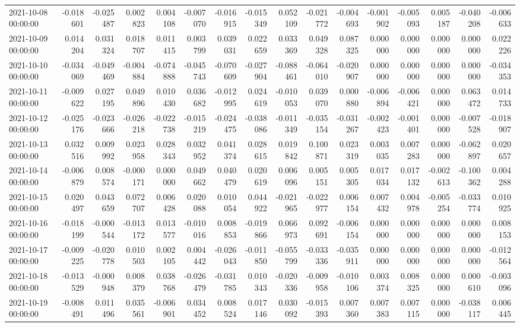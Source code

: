 \begin{tabular}{lrrrrrrrrrrrrrrr}
2021-10-08 00:00:00 & -0.018601 & -0.025487 & 0.002823 & 0.004108 & -0.007070 & -0.016915 & -0.015349 & 0.052109 & -0.021772 & -0.004693 & -0.001902 & -0.005093 & 0.005187 & -0.040208 & -0.006633 \\
2021-10-09 00:00:00 & 0.014204 & 0.031324 & 0.018707 & 0.011415 & 0.003799 & 0.039031 & 0.022659 & 0.033369 & 0.049328 & 0.087325 & 0.000000 & 0.000000 & 0.000000 & 0.000000 & 0.022226 \\
2021-10-10 00:00:00 & -0.034069 & -0.049469 & -0.004884 & -0.074888 & -0.045743 & -0.070609 & -0.027904 & -0.088461 & -0.064010 & -0.020907 & 0.000000 & 0.000000 & 0.000000 & 0.000000 & -0.034353 \\
2021-10-11 00:00:00 & -0.009622 & 0.027195 & 0.049896 & 0.010430 & 0.036682 & -0.012995 & 0.024619 & -0.010053 & 0.039070 & 0.000880 & -0.006894 & -0.006421 & 0.000000 & 0.063472 & 0.014733 \\
2021-10-12 00:00:00 & -0.025176 & -0.023666 & -0.026218 & -0.022738 & -0.015219 & -0.024475 & -0.038086 & -0.011349 & -0.035154 & -0.031267 & -0.002423 & -0.001401 & 0.000000 & -0.007528 & -0.018907 \\
2021-10-13 00:00:00 & 0.032516 & 0.009992 & 0.023958 & 0.028343 & 0.032952 & 0.041374 & 0.028615 & 0.019842 & 0.100871 & 0.023319 & 0.003035 & 0.007283 & 0.000000 & -0.062897 & 0.020657 \\
2021-10-14 00:00:00 & -0.006879 & 0.008574 & -0.000171 & 0.000000 & 0.049662 & 0.040479 & 0.020619 & 0.006096 & 0.005151 & 0.005305 & 0.017034 & 0.017132 & -0.002613 & -0.100362 & 0.004288 \\
2021-10-15 00:00:00 & 0.020497 & 0.043659 & 0.072707 & 0.006428 & 0.020088 & 0.010054 & 0.044922 & -0.021965 & -0.022977 & 0.006154 & 0.007432 & 0.004978 & -0.005254 & -0.033774 & 0.010925 \\
2021-10-16 00:00:00 & -0.018199 & -0.000544 & -0.013172 & 0.013577 & -0.010016 & 0.008853 & -0.019866 & 0.066973 & 0.092691 & -0.006154 & 0.000000 & 0.000000 & 0.000000 & 0.000000 & 0.008153 \\
2021-10-17 00:00:00 & -0.009225 & -0.020778 & 0.010503 & 0.002105 & 0.004442 & -0.026043 & -0.011850 & -0.055799 & -0.033336 & -0.035911 & 0.000000 & 0.000000 & 0.000000 & 0.000000 & -0.012564 \\
2021-10-18 00:00:00 & -0.013529 & -0.000948 & 0.008379 & 0.038768 & -0.026479 & -0.031785 & 0.010343 & -0.020336 & -0.009958 & -0.010106 & 0.003374 & 0.008325 & 0.000000 & 0.000610 & -0.003096 \\
2021-10-19 00:00:00 & -0.008491 & 0.011496 & 0.035561 & -0.006901 & 0.034452 & 0.008524 & 0.017146 & 0.030092 & -0.015393 & 0.007360 & 0.007383 & 0.007115 & 0.000000 & -0.038117 & 0.006445 \\

\end{tabular}
